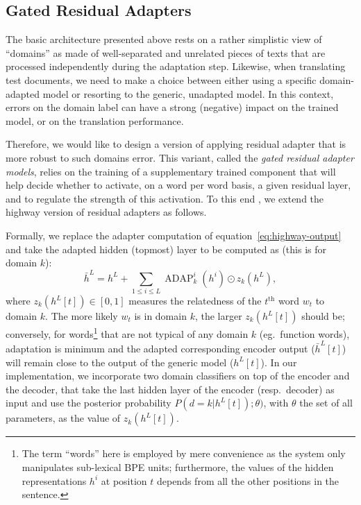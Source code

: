 \documentclass[11pt,a4paper]{article}
\newcommand{\fyDone}[1]{\done[FY]\Todo[FY:]{\textcolor{orange}{#1}}}
\newcommand{\mpTodo}[1]{\Todo[MP:]{\textcolor{green}{#1}}}
\begin{document}
\subsection{Gated Residual Adapters \label{ssec:gate}}
\mpTodo{Formalizing problem, network design, training algorithm}
The basic architecture presented above rests on a rather simplistic view of ``domains'' as made of well-separated and unrelated pieces of texts that are processed independently during the adaptation step. Likewise, when translating test documents, we need to make a choice between either using a specific domain-adapted model or resorting to the generic, unadapted model. In this context, errors on the domain label can have a strong (negative) impact on the trained model, or on the translation performance. 

Therefore, we would like to design a version of applying residual adapter that is more robust to such domains error. This variant, called the \emph{gated residual adapter models}, relies on the training of a supplementary trained component that will help decide whether to activate, on a word per word basis, a given residual layer, and to regulate the strength of this activation. To this end , we extend the highway version of residual adapters as follows.
\fyDone{Consistency of notations wrt section 2.1}

Formally, we replace the adapter computation of equation~\eqref{eq:highway-output} and take the adapted hidden (topmost) layer to be computed as (this is for domain $k$):
\begin{equation}
  \bar{h}^L = h^L + \displaystyle{\mathop{\sum}_{1 \leq i \leq L} \operatorname{ADAP}_k^i(h^i) \odot{} z_k(h^L)}, \label{eq:gated-output}
\end{equation}
where $z_k(h^L[t]) \in [0,1]$ measures the relatedness of the $t^{\text{th}}$ word $w_t$ to domain $k$. The more likely $w_t$ is in domain $k$, the larger $z_k(h^L[t])$ should be; conversely, for words\footnote{The term ``words'' here is employed by mere convenience as the system only manipulates sub-lexical BPE units; furthermore, the values of the hidden representations $h^{i}$ at position $t$ depends from all the other positions in the sentence.} that are not typical of any domain $k$ (eg.\ function words),  adaptation is minimum and the adapted corresponding encoder output ($\bar{h}^L[t]$) will remain close to the output of the generic model ($h^L[t]$). In our implementation, we incorporate two domain classifiers on top of the encoder and the decoder, that take the last hidden layer of the encoder (resp.\ decoder) as input and use the posterior probability $P(d=k|h^L[t]); \theta)$, with $\theta$ the set of all parameters, as the value of $z_k(h^L[t])$.
\end{document}
